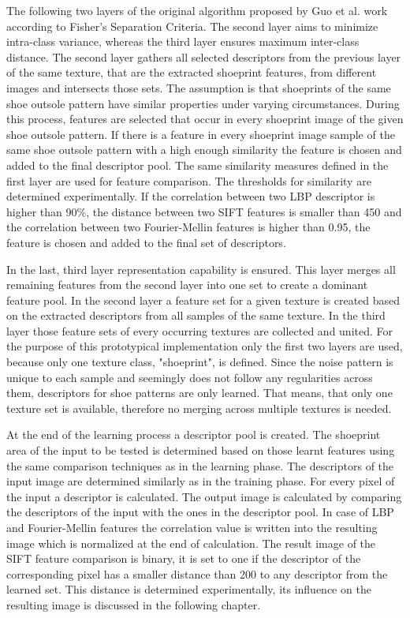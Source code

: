 \documentclass[draft,final]{vutinfth} %
\begin{document}
\par
The following two layers of the original algorithm proposed by Guo et al. \cite{guo2012discriminative}  work according to Fisher's Separation Criteria.
The second layer aims to minimize intra-class variance, whereas the third layer ensures maximum inter-class distance. 
The second layer gathers all selected descriptors from the previous layer of the same texture, that are the extracted shoeprint features, from different images and intersects those sets.
The assumption is that shoeprints of the same shoe outsole pattern have similar properties under varying circumstances.
During this process, features are selected that occur in every shoeprint image of the given shoe outsole pattern.
If there is a feature in every shoeprint image sample of the same shoe outsole pattern with a high enough similarity the feature is chosen and added to the final descriptor pool.
The same similarity measures defined in the first layer are used for feature comparison.
The thresholds for similarity are determined experimentally.
If the correlation between two LBP descriptor is higher than 90\%, the distance between two SIFT features is smaller than 450 and the correlation between two Fourier-Mellin features is higher than 0.95, the feature is chosen and added to the final set of descriptors.
\par
In the last, third layer representation capability is ensured.
This layer merges all remaining features from the second layer into one set to create a dominant feature pool.
In the second layer a feature set for a given texture is created based on the extracted descriptors from all samples of the same texture.
In the third layer those feature sets of every occurring textures are collected and united.
For the purpose of this prototypical implementation only the first two layers are used, because only one texture class, "shoeprint", is defined.
Since the noise pattern is unique to each sample and seemingly does not follow any regularities across them, descriptors for shoe patterns are only learned.
That means, that only one texture set is available, therefore no merging across multiple textures is needed.
\par
At the end of the learning process a descriptor pool is created.
The shoeprint area of the input to be tested is determined based on those learnt features using the same comparison techniques as in the learning phase.
The descriptors of the input image are determined similarly as in the training phase.
For every pixel of the input a descriptor is calculated.
The output image is calculated by comparing the descriptors of the input with the ones in the descriptor pool.
In case of LBP and Fourier-Mellin features the correlation value is written into the resulting image which is normalized at the end of calculation.
The result image of the SIFT feature comparison is binary, it is set to one if the descriptor of the corresponding pixel has a smaller distance than 200 to any descriptor from the learned set.
This distance is determined experimentally, its influence on the resulting image is discussed in the following chapter.
\end{document}

